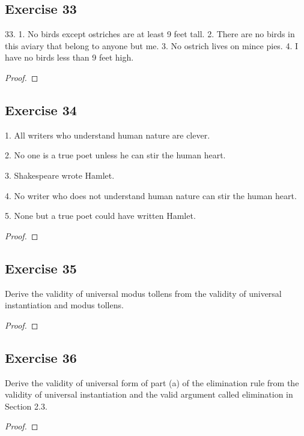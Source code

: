 \documentclass[14pt]{extarticle}
\begin{document}
\subsection{Exercise 33}
33. 1. No birds except ostriches are at least 9 feet tall.
2. There are no birds in this aviary that belong to
anyone but me.
3. No ostrich lives on mince pies.
4. I have no birds less than 9 feet high.

\begin{proof}

\end{proof}

\subsection{Exercise 34}
1. All writers who understand human nature are clever.

2. No one is a true poet unless he can stir the human heart.

3. Shakespeare wrote Hamlet.

4. No writer who does not understand human nature can stir the human heart.

5. None but a true poet could have written Hamlet.

\begin{proof}

\end{proof}

\subsection{Exercise 35}
Derive the validity of universal modus tollens from the validity of universal instantiation and modus tollens.

\begin{proof}

\end{proof}

\subsection{Exercise 36}
Derive the validity of universal form of part (a) of the elimination rule from the validity of universal instantiation and the valid argument called elimination in Section 2.3.

\begin{proof}

\end{proof}
\end{document}
